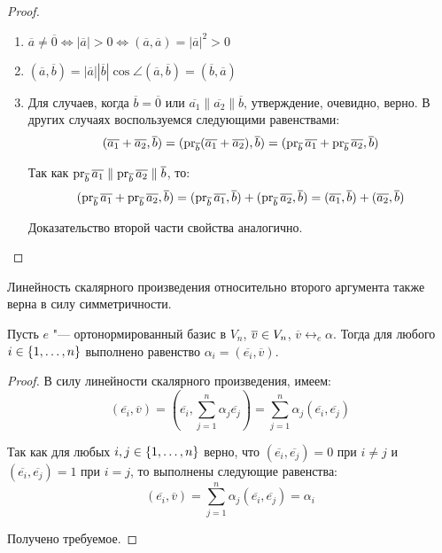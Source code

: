 \begin{proof}~
	\begin{enumerate}
		\item $\overline{a} \ne \overline{0} \Leftrightarrow |\overline{a}| > 0 \Leftrightarrow (\overline{a}, \overline{a}) = |\overline{a}|^2 > 0$
		\item $(\overline{a}, \overline{b}) = |\overline{a}||\overline{b}|\cos{\angle(\overline{a}, \overline{b})} = (\overline{b}, \overline{a})$
		\item Для случаев, когда $\overline{b} = \overline{0}$ или $\overline{a_1} \parallel \overline{a_2} \parallel \overline{b}$, утверждение, очевидно, верно. В других случаях воспользуемся следующими равенствами:
		\[(\overline{a_1} + \overline{a_2}, \overline{b}) = (\operatorname{pr}_{\overline{b}}(\overline{a_1} + \overline{a_2}), \overline{b}) = (\operatorname{pr}_{\overline{b}}\overline{a_1} + \operatorname{pr}_{\overline{b}}\overline{a_2}, \overline{b})\]
		
		Так как $\operatorname{pr}_{\overline{b}}\overline{a_1} \parallel \operatorname{pr}_{\overline{b}}\overline{a_2} \parallel \overline{b}$, то:
		\[(\operatorname{pr}_{\overline{b}}\overline{a_1} + \operatorname{pr}_{\overline{b}}\overline{a_2}, \overline{b}) = (\operatorname{pr}_{\overline{b}}\overline{a_1}, \overline{b}) + (\operatorname{pr}_{\overline{b}}\overline{a_2}, \overline{b}) = (\overline{a_1}, \overline{b}) + (\overline{a_2}, \overline{b})\]
		
		Доказательство второй части свойства аналогично.\qedhere
	\end{enumerate}
\end{proof}

\begin{note}
	Линейность скалярного произведения относительно второго аргумента также верна в силу симметричности.
\end{note}

\begin{proposition}
	Пусть $e$ "--- ортонормированный базис в $V_n$, $\overline{v} \hm{\in} V_n$, $\overline{v} \leftrightarrow_{e} \alpha$. Тогда для любого $i \in \{1, \dotsc, n\}$ выполнено равенство $\alpha_i = (\overline{e_i}, \overline{v})$.
\end{proposition}

\begin{proof}
	В силу линейности скалярного произведения, имеем:
	\[(\overline{e_i}, \overline{v}) = \left(\overline{e_i}, \sum_{j = 1}^{n}\alpha_j\overline{e_j}\right) = \sum_{j = 1}^{n}\alpha_j(\overline{e_i}, \overline{e_j})\]
	
	Так как для любых $i, j \in \{1, \dotsc, n\}$ верно, что $(\overline{e_i}, \overline{e_j}) = 0$ при $i \ne j$ и $(\overline{e_i}, \overline{e_j}) = 1$ при $i = j$, то выполнены следующие равенства:
	\[(\overline{e_i}, \overline{v}) = \sum_{j = 1}^{n}\alpha_j(\overline{e_i}, \overline{e_j}) = \alpha_i\]
	
	Получено требуемое.
\end{proof}

